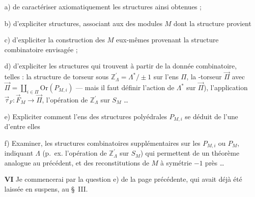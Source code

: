\documentclass[11pt,a4paper]{article}
\begin{document}
a) de caractériser axiomatiquement les structures ainsi obtenues ;

b) d'expliciter  structures,  associant aux
\struck{\ill{}}  des modules $M$ dont la structure provient

c) d'expliciter la construction des $M$ eux-mêmes  provenant la structure
combinatoire envisagée ;

d) d'expliciter les  structures qui  trouvent à partir de la
donnée combinatoire, telles : la structure de \struck{\ill{}} torseur sous
$\mathbb{Z}^{\prime}_\Lambda = \Lambda^{*}/\pm1$ sur l'ens $\Pi$,
  la \uncertain{$\Lambda^{\pm}$}-torseur $\vec{\Pi}$
avec $\vec{\Pi} = \coprod_{i\in\Pi}\mathrm{Or}(P_{M,i})$ — mais il faut définir l'action de
$\Lambda^{*}$ sur $\vec{\Pi}$), l'application $\vec{\tau}_F\colon \vec{F}_M\to\vec{\Pi}$,
l'opération de $\mathbb{Z}^{\prime}_\Lambda$ sur $S_M$ …

e) Expliciter comment l'ens des structures polyédrales $P_{M,i}$ se déduit de l'une
d'entre elles

f) Examiner,  les structures combinatoires supplémentaires sur
les $P_{M,i}$ ou $P_M$, indiquant $\Lambda$ (p.~ex. l'opération de
$\mathbb{Z}^{\prime}_\Lambda$ sur $S_M$) qui permettent de  un théorème
analogue au précédent, et des reconstitutions de $M$ à symétrie $-1$ près …

\textbf{VI} Je commencerai par la question e) de la page précédente, qui avait déjà été
laissée en suspens, au §~III.
\end{document}
